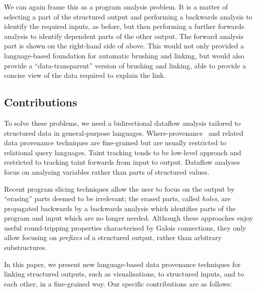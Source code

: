 We can again frame this as a program analysis problem. It is a matter of selecting a part of the structured output and performing a backwards analysis to identify the required inputs, as before, but then performing a further forwards analysis to identify dependent parts of the other output. The forward analysis part is shown on the right-hand side of  above. This would not only provided a language-based foundation for automatic brushing and linking, but would also provide a ``data-transparent'' version of brushing and linking, able to provide a concise view of the data required to explain the link.

\subsection{Contributions}

To solve these problems, we need a bidirectional dataflow analysis tailored to structured data in general-purpose languages. Where-provenance~\cite{buneman01} and related data provenance techniques are fine-grained but are usually restricted to relational query languages. Taint tracking \cite{newsome05} tends to be low-level approach and restricted to tracking taint forwards from input to output. Dataflow analyses \cite{reps95} focus on analysing variables rather than parts of structured values.

Recent program slicing techniques \cite{perera12a,perera13a,ricciotti17} allow the user to focus on the output by ``erasing'' parts deemed to be irrelevant; the erased parts, called \emph{holes}, are propagated backwards by a backwards analysis which identifies parts of the program and input which are no longer needed. Although these approaches enjoy useful round-tripping properties characterised by Galois connections, they only allow focusing on \emph{prefixes} of a structured output, rather than arbitrary substructures.

In this paper, we present new language-based data provenance techniques for linking structured outputs, such as visualisations, to structured inputs, and to each other, in a fine-grained way. Our specific contributions are as follows:

